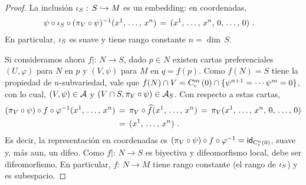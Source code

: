 \begin{proof}
	La inclusi\'{o}n $\inc[S]:\,S\hookrightarrow M$ es un embedding: en
	coordenadas,
	\begin{align*}
		\psi\circ\inc[S]\circ(\pi_V\circ\psi)^{-1}(\lista*{x}{n})
			& \,=\,(\lista*{x}{n},\,0,\,\dots,\,0)
		\text{ .}
	\end{align*}
	En particular, $\inc[S]$ es suave y tiene rango constante $n=\dim\,S$.

	Si consideramos ahora $f|:\,N\rightarrow S$, dado $p\in N$ existen
	cartas preferenciales $(U,\varphi)$ para $N$ en $p$ y $(V,\psi)$ para
	$M$ en $q=f(p)$. Como $f(N)=S$ tiene la propiedad de $n$-subvariedad,
	vale que
	\begin{math}
		f(N)\cap V=
			\cubo[m]{\epsilon}{0}\cap\{\psi^{n+1}=\cdots\psi^m=0\}
	\end{math}, con lo cual, $(V,\psi)\in\cal A$ y
	$(V\cap S,\pi_V\circ\psi)\in\cal A_S$. Con respecto a estas cartas,
	\begin{align*}
		(\pi_V\circ\psi)\circ f\circ\varphi^{-1}(\lista*{x}{n}) & \,=\,
			\pi_V\circ\encoordenadas{f}(\lista*{x}{n}) \,=\,
			\pi_V(\lista*{x}{n},\,0,\,\dots,\,0) \\
		& \,=\, (\lista*{x}{n})
		\text{ .}
	\end{align*}
	Es decir, la representaci\'{o}n en coordenadas es
	\begin{math}
		(\pi_V\circ\psi)\circ f\circ\varphi^{-1}=
			\id[{\cubo[n]{\epsilon}{0}}]
	\end{math}, suave y, m\'{a}s aun, un difeo. Como $f|:\,N\rightarrow S$
	es biyectiva y difeomorfismo local, debe ser difeomorfismo. En
	particular, $f:\,N\rightarrow M$ tiene rango constante (el rango de
	$\inc[S]$) y es subespacio.
\end{proof}
